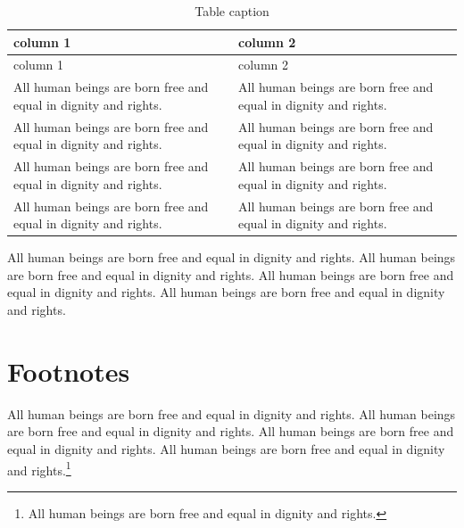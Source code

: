 \documentclass[
  ngerman,
  american,
  titlepage,
  openright,
  DIV=calc,
  toc=listof,
  listof=nochaptergap]{scrbook}
\begin{document}
\begin{longtable}[]{@{}
  >{\raggedright\arraybackslash}p{}
  >{\raggedright\arraybackslash}p{}@{}}
\caption{Table caption}\label{tbl-example}\tabularnewline
\toprule\noalign{}
\begin{minipage}[b]{\linewidth}\raggedright
column 1
\end{minipage} & \begin{minipage}[b]{\linewidth}\raggedright
column 2
\end{minipage} \\
\midrule\noalign{}
\endfirsthead
\toprule\noalign{}
\begin{minipage}[b]{\linewidth}\raggedright
column 1
\end{minipage} & \begin{minipage}[b]{\linewidth}\raggedright
column 2
\end{minipage} \\
\midrule\noalign{}
\endhead
\bottomrule\noalign{}
\endlastfoot
All human beings are born free and equal in dignity and rights. & All
human beings are born free and equal in dignity and rights. \\
All human beings are born free and equal in dignity and rights. & All
human beings are born free and equal in dignity and rights. \\
All human beings are born free and equal in dignity and rights. & All
human beings are born free and equal in dignity and rights. \\
All human beings are born free and equal in dignity and rights. & All
human beings are born free and equal in dignity and rights. \\
\end{longtable}

All human beings are born free and equal in dignity and rights. All
human beings are born free and equal in dignity and rights. All human
beings are born free and equal in dignity and rights. All human beings
are born free and equal in dignity and rights.

\section{Footnotes}\label{footnotes}

All human beings are born free and equal in dignity and rights. All
human beings are born free and equal in dignity and rights. All human
beings are born free and equal in dignity and rights. All human beings
are born free and equal in dignity and rights.\footnote{All human beings
  are born free and equal in dignity and rights.}
\end{document}

